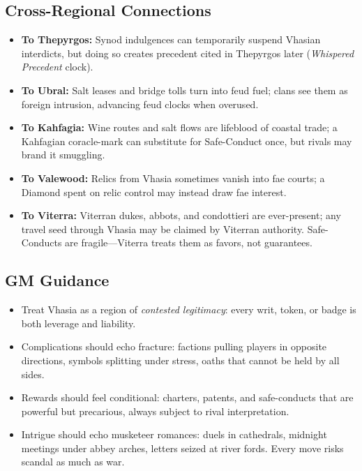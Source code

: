 \subsection*{Cross-Regional Connections}
\label{sec:vhasia-cross}
\begin{itemize}
\item \textbf{To Thepyrgos:} Synod indulgences can temporarily suspend Vhasian interdicts, but doing so creates precedent cited in Thepyrgos later (\emph{Whispered Precedent} clock).
\item \textbf{To Ubral:} Salt leases and bridge tolls turn into feud fuel; clans see them as foreign intrusion, advancing feud clocks when overused.
\item \textbf{To Kahfagia:} Wine routes and salt flows are lifeblood of coastal trade; a Kahfagian coracle-mark can substitute for Safe-Conduct once, but rivals may brand it smuggling.
\item \textbf{To Valewood:} Relics from Vhasia sometimes vanish into fae courts; a Diamond spent on relic control may instead draw fae interest.
\item \textbf{To Viterra:} Viterran dukes, abbots, and condottieri are ever-present; any travel seed through Vhasia may be claimed by Viterran authority. Safe-Conducts are fragile—Viterra treats them as favors, not guarantees.
\end{itemize}

\subsection*{GM Guidance}
\label{sec:vhasia-gm}
\begin{itemize}
\item Treat Vhasia as a region of \emph{contested legitimacy}: every writ, token, or badge is both leverage and liability.
\item Complications should echo fracture: factions pulling players in opposite directions, symbols splitting under stress, oaths that cannot be held by all sides.
\item Rewards should feel conditional: charters, patents, and safe-conducts that are powerful but precarious, always subject to rival interpretation.
\item Intrigue should echo musketeer romances: duels in cathedrals, midnight meetings under abbey arches, letters seized at river fords. Every move risks scandal as much as war.
\end{itemize}